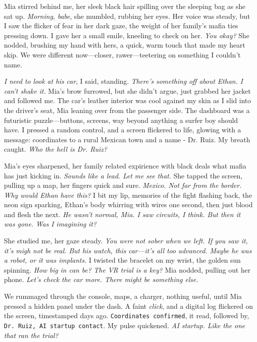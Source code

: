 \documentclass[12pt,oneside]{book}
\newcommand{\note}[1]{\texttt{#1}}
\begin{document}
Mia stirred behind me, her sleek black hair spilling over the sleeping bag as she sat up. \textit{Morning, babe}, she mumbled, rubbing her eyes. Her voice was steady, but I saw the flicker of fear in her dark gaze, the weight of her family’s mafia ties pressing down. I gave her a small smile, kneeling to check on her. \textit{You okay?} She nodded, brushing my hand with hers, a quick, warm touch that made my heart skip. We were different now—closer, rawer—teetering on something I couldn’t name.

\textit{I need to look at his car}, I said, standing. \textit{There’s something off about Ethan. I can’t shake it.} Mia’s brow furrowed, but she didn’t argue, just grabbed her jacket and followed me. The car’s leather interior was cool against my skin as I slid into the driver’s seat, Mia leaning over from the passenger side. The dashboard was a futuristic puzzle—buttons, screens, way beyond anything a surfer boy should have. I pressed a random control, and a screen flickered to life, glowing with a message: coordinates to a rural Mexican town and a name - \textnormal{Dr. Ruiz}. My breath caught. \textit{Who the hell is Dr. Ruiz?}

Mia’s eyes sharpened, her family related expirience with black deals what mafia has just kicking in. \textit{Sounds like a lead. Let me see that.} She tapped the screen, pulling up a map, her fingers quick and sure. \textit{Mexico. Not far from the border. Why would Ethan have this?} I bit my lip, memories of the fight flashing back, the neon sign sparking, Ethan’s body whirring with wires one second, then just blood and flesh the next. \textit{He wasn’t normal, Mia. I saw circuits, I think. But then it was gone. Was I imagining it?}

She studied me, her gaze steady. \textit{You were not sober when we left. If you saw it, it’s migh not be real. But his watch, this car—it’s all too advanced. Maybe he was a robot, or it was implants.} I twisted the bracelet on my wrist, the golden sun spinning. \textit{How big in can be? The VR trial is a key?} Mia nodded, pulling out her phone. \textit{Let’s check the car more. There might be something else.}

We rummaged through the console, maps, a charger, nothing useful, until Mia pressed a hidden panel under the dash. A faint \textit{click}, and a digital log flickered on the screen, timestamped days ago. \note{Coordinates confirmed}, it read, followed by, \note{Dr. Ruiz, AI startup contact}. My pulse quickened. \textit{AI startup. Like the one that ran the trial?}
\end{document}
